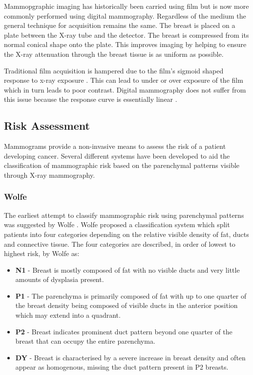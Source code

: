 Mammopgraphic imaging has historically been carried using film but is now more commonly performed using digital mammography. Regardless of the medium the general technique for acquisition remains the same. The breast is placed on a plate between the X-ray tube and the detector. The breast is compressed from its normal conical shape onto the plate. This improves imaging by helping to ensure the X-ray attenuation through the breast tissue is as uniform as possible. 

Traditional film acquisition is hampered due to the film's sigmoid shaped response to x-ray exposure \cite{kopans1998breast}. This can lead to under or over exposure of the film which in turn leads to poor contrast. Digital mammography does not suffer from this issue because the response curve is essentially linear \cite{kopans1998breast}.


\subsection{Risk Assessment}
Mammograms provide a non-invasive means to assess the risk of a patient developing cancer. Several different systems have been developed to aid the classification of mammographic risk based on the parenchymal patterns visible through X-ray mammography.

\subsubsection{Wolfe}
The earliest attempt to classify mammographic risk using parenchymal patterns was suggested by Wolfe \cite{wolfe1976breast}. Wolfe proposed a classification system which split patients into four categories depending on the relative visible density of fat, ducts and connective tissue. The four categories are described, in order of lowest to highest risk, by Wolfe \cite{wolfe1976breast} as:

\begin{itemize}
	\item \textbf{N1} - Breast is mostly composed of fat with no visible ducts and very little amounts of dysplasia present. 
	\item \textbf{P1} - The parenchyma is primarily composed of fat with up to one quarter of the breast density being composed of visible ducts in the anterior position which may extend into a quadrant.
	\item \textbf{P2} - Breast indicates prominent duct pattern beyond one quarter of the breast that can occupy the entire parenchyma.
	\item \textbf{DY} - Breast is characterised by a severe increase in breast density and often appear as homogenous, missing the duct pattern present in P2 breasts.
\end{itemize}

